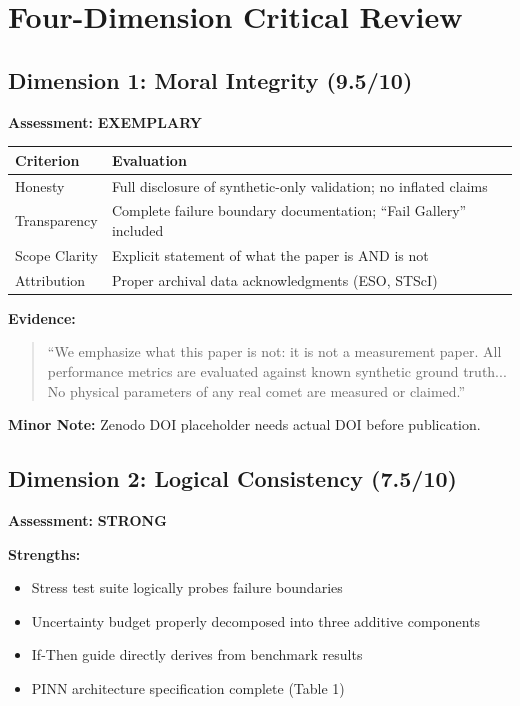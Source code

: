 \documentclass[12pt,a4paper]{article}
\newcommand{\good}[1]{\textcolor{GoodGreen}{\textbf{#1}}}
\newcommand{\excellent}[1]{\textcolor{ExcellentGreen}{\textbf{#1}}}
\begin{document}
\section{Four-Dimension Critical Review}

\subsection{Dimension 1: Moral Integrity (9.5/10)}

\textbf{Assessment:} \excellent{EXEMPLARY}

\begin{center}
\begin{tabular}{|l|p{10cm}|}
\hline
\textbf{Criterion} & \textbf{Evaluation} \\
\hline
Honesty & Full disclosure of synthetic-only validation; no inflated claims \\
Transparency & Complete failure boundary documentation; ``Fail Gallery'' included \\
Scope Clarity & Explicit statement of what the paper is AND is not \\
Attribution & Proper archival data acknowledgments (ESO, STScI) \\
\hline
\end{tabular}
\end{center}

\textbf{Evidence:}
\begin{quote}
``We emphasize what this paper is not: it is not a measurement paper. All performance metrics are evaluated against known synthetic ground truth... No physical parameters of any real comet are measured or claimed.''
\end{quote}

\textbf{Minor Note:} Zenodo DOI placeholder needs actual DOI before publication.

\subsection{Dimension 2: Logical Consistency (7.5/10)}

\textbf{Assessment:} \good{STRONG}

\textbf{Strengths:}
\begin{itemize}
\item Stress test suite logically probes failure boundaries
\item Uncertainty budget properly decomposed into three additive components
\item If-Then guide directly derives from benchmark results
\item PINN architecture specification complete (Table 1)
\end{itemize}
\end{document}
